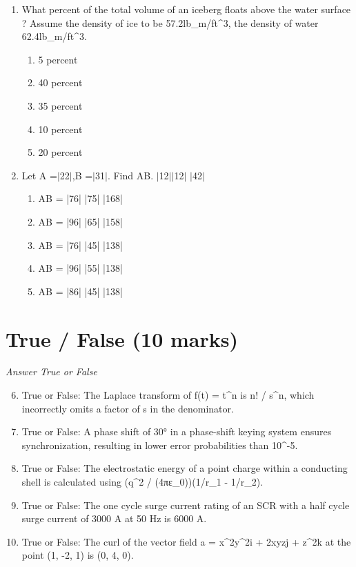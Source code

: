 \documentclass[12pt]{article}
\begin{document}
\begin{enumerate}[label=\arabic*.]
\begin{enumerate}[label=(\alph*)]
    \item z\_11 = 4.44 \ensuremath{\Omega}, z\_12 = z\_21 = 1.11 \ensuremath{\Omega}, z\_22 = 22.2 \ensuremath{\Omega}
    \item z\_11 = 4.44 \ensuremath{\Omega}, z\_12 = z\_21 = 2.22 \ensuremath{\Omega}, z\_22 = 22.2 \ensuremath{\Omega}
\end{enumerate}
\item What percent of the total volume of an iceberg floats above the water surface ? Assume the
density of ice to be 57.2lb\_m/ft\^{}3, the density of water 62.4lb\_m/ft\^{}3.
\begin{enumerate}[label=(\alph*)]
    \item 5 percent
    \item 40 percent
    \item 35 percent
    \item 10 percent
    \item 20 percent
\end{enumerate}
\item Let A =\ensuremath{\vert}22\ensuremath{\vert},B =\ensuremath{\vert}31\ensuremath{\vert}. Find AB. \ensuremath{\vert}12\ensuremath{\vert}\ensuremath{\vert}12\ensuremath{\vert} \ensuremath{\vert}42\ensuremath{\vert}
\begin{enumerate}[label=(\alph*)]
    \item AB = |76| |75| |168|
    \item AB = |96| |65| |158|
    \item AB = |76| |45| |138|
    \item AB = |96| |55| |138|
    \item AB = |86| |45| |138|
\end{enumerate}
\end{enumerate}

\section*{True / False (10 marks)}
\textit{Answer True or False}
\begin{enumerate}[label=\arabic*.]
\setcounter{enumi}{5}
\item True or False: The Laplace transform of f(t) = t\^{}n is n! / s\^{}n, which incorrectly omits a factor of s in the denominator.
\item True or False: A phase shift of 30° in a phase-shift keying system ensures synchronization, resulting in lower error probabilities than 10\^{}-5.
\item True or False: The electrostatic energy of a point charge within a conducting shell is calculated using (q\^{}2 / (4πε\_0))(1/r\_1 - 1/r\_2).
\item True or False: The one cycle surge current rating of an SCR with a half cycle surge current of 3000 A at 50 Hz is 6000 A.
\item True or False: The curl of the vector field a = x\^{}2y\^{}2i + 2xyzj + z\^{}2k at the point (1, -2, 1) is (0, 4, 0).
\end{enumerate}
\end{document}
